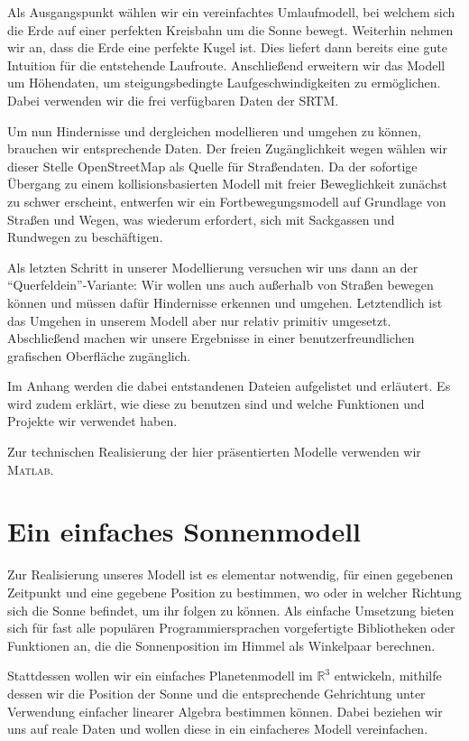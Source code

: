 \documentclass[
    paper=a4,
    DIV14,
    fontsize=12pt,
    pagesize=pdftex,
    toc=bibliographynumbered
]{scrartcl}
\numberwithin{figure}{section}
\numberwithin{equation}{section}
\numberwithin{table}{section}
\newcommand*\setR{\mathds{R}}
\begin{document}
Als Ausgangspunkt wählen wir ein vereinfachtes Umlaufmodell, bei welchem sich die Erde
auf einer perfekten Kreisbahn um die Sonne bewegt. Weiterhin nehmen wir an, dass die Erde
eine perfekte Kugel ist. Dies liefert dann bereits eine gute Intuition für die
entstehende Laufroute. Anschließend erweitern wir das Modell um Höhendaten, um
steigungsbedingte Laufgeschwindigkeiten zu ermöglichen. Dabei verwenden wir die frei
verfügbaren Daten der SRTM.

Um nun Hindernisse und dergleichen modellieren und umgehen zu können, brauchen wir
entsprechende Daten. Der freien Zugänglichkeit wegen wählen wir dieser Stelle
OpenStreetMap als Quelle für Straßendaten. Da der sofortige Übergang zu einem
kollisionsbasierten Modell mit freier Beweglichkeit zunächst zu schwer erscheint,
entwerfen wir ein Fortbewegungsmodell auf Grundlage von Straßen und Wegen, was wiederum
erfordert, sich mit Sackgassen und Rundwegen zu beschäftigen.

Als letzten Schritt in unserer Modellierung versuchen wir uns dann an der
\enquote{Querfeldein}-Variante: Wir wollen uns auch außerhalb von Straßen bewegen
können und müssen dafür Hindernisse erkennen und umgehen. Letztendlich ist das Umgehen in
unserem Modell aber nur relativ primitiv umgesetzt. Abschließend machen wir unsere
Ergebnisse in einer benutzerfreundlichen grafischen Oberfläche zugänglich.

Im Anhang werden die dabei entstandenen Dateien aufgelistet und erläutert. Es wird zudem
erklärt, wie diese zu benutzen sind und welche Funktionen und Projekte wir verwendet haben.

Zur technischen Realisierung der hier präsentierten Modelle verwenden wir \textsc{Matlab}.

\section{Ein einfaches Sonnenmodell}
Zur Realisierung unseres Modell ist es elementar notwendig, für einen gegebenen Zeitpunkt
und eine gegebene Position zu bestimmen, wo oder in welcher Richtung sich die Sonne
befindet, um ihr folgen zu können. Als einfache Umsetzung bieten sich für fast alle
populären Programmiersprachen vorgefertigte Bibliotheken oder Funktionen an, die die
Sonnenposition im Himmel als Winkelpaar berechnen.

Stattdessen wollen wir ein einfaches Planetenmodell im $\setR^3$ entwickeln, mithilfe
dessen wir die Position der Sonne und die entsprechende Gehrichtung unter Verwendung
einfacher linearer Algebra bestimmen können. Dabei beziehen wir uns auf reale Daten und
wollen diese in ein einfacheres Modell vereinfachen.
\end{document}
